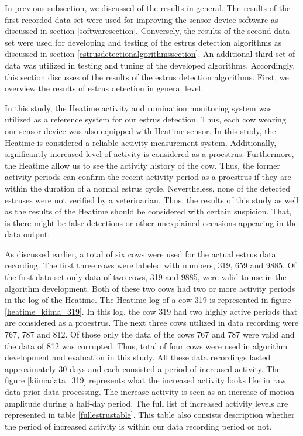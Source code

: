 \documentclass[english,12pt,a4paper,pdftex,elec,utf8]{aaltothesis}
\begin{document}
In previous subsection, we discussed of the results in general. The results of the first recorded data set were used for improving the sensor device software as discussed in section \ref{softwaresection}. Conversely, the results of the second data set were used for developing and testing of the estrus detection algorithms as discussed in section \ref{estrusdetectionalgorithmssection}. An additional third set of data was utilized in testing and tuning of the developed algorithms. Accordingly, this section discusses of the results of the estrus detection algorithms. First, we overview the results of estrus detection in general level. 

In this study, the Heatime activity and rumination monitoring system was utilized as a reference system for our estrus detection. Thus, each cow wearing our sensor device was also equipped with Heatime sensor. In this study, the Heatime is considered a reliable activity measurement system. Additionally, significantly increased level of activity is considered as a proestrus. Furthermore, the Heatime allow us to see the activity history of the cow. Thus, the former activity periods can confirm the recent activity period as a proestrus if they are within the duration of a normal estrus cycle. Nevertheless, none of the detected estruses were not verified by a veterinarian. Thus, the results of this study as well as the results of the Heatime should be considered with certain suspicion. That, is there might be false detections or other unexplained occasions appearing in the data output.

As discussed earlier, a total of six cows were used for the actual estrus data recording. The first three cows were labeled with numbers, 319, 659 and 9885. Of the first data set only data of two cows, 319 and 9885, were valid to use in the algorithm development. Both of these two cows had two or more activity periods in the log of the Heatime. The Heatime log of a cow 319 is represented in figure \ref{heatime_kiima_319}. In this log, the cow 319 had two highly active periods that are considered as a proestrus. The next three cows utilized in data recording were 767, 787 and 812. Of those only the data of the cows 767 and 787 were valid and the data of 812 was corrupted. Thus, total of four cows were used in algorithm development and evaluation in this study. All these data recordings lasted approximately 30 days and each consisted a period of increased activity. The figure \ref{kiimadata_319} represents what the increased activity looks like in raw data prior data processing. The increase activity is seen as an increase of motion amplitude during a half-day period. The full list of increased activity levels are represented in table \ref{fullestrustable}. This table also consists description whether the period of increased activity is within our data recording period or not.
\end{document}
